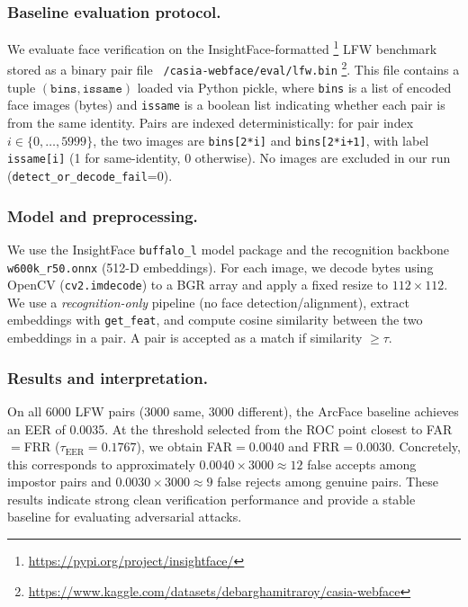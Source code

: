 \documentclass[cameraready]{Interspeech}
\begin{document}
\subsubsection{Baseline evaluation protocol.}
We evaluate face verification on the InsightFace-formatted \footnote{\url{https://pypi.org/project/insightface/}} LFW benchmark stored as a binary pair file
\texttt{~/casia-webface/eval/lfw.bin} \footnote{\url{https://www.kaggle.com/datasets/debarghamitraroy/casia-webface}}.
This file contains a tuple $(\texttt{bins}, \texttt{issame})$ loaded via Python pickle, where
\texttt{bins} is a list of encoded face images (bytes) and \texttt{issame} is a boolean list indicating whether each pair is from the same identity.
Pairs are indexed deterministically: for pair index $i\in\{0,\dots,5999\}$, the two images are \texttt{bins[2*i]} and \texttt{bins[2*i+1]}, with label \texttt{issame[i]} (1 for same-identity, 0 otherwise).
No images are excluded in our run (\texttt{detect\_or\_decode\_fail}=0).

\subsubsection{Model and preprocessing.}
We use the InsightFace \texttt{buffalo\_l} model package and the recognition backbone \texttt{w600k\_r50.onnx} (512-D embeddings).
For each image, we decode bytes using OpenCV (\texttt{cv2.imdecode}) to a BGR array and apply a fixed resize to $112\times112$.
We use a \emph{recognition-only} pipeline (no face detection/alignment), extract embeddings with \texttt{get\_feat}, and compute cosine similarity between the two embeddings in a pair.
A pair is accepted as a match if similarity $\ge \tau$.

\subsubsection{Results and interpretation.}
On all 6000 LFW pairs (3000 same, 3000 different), the ArcFace baseline achieves an EER of 0.0035.
At the threshold selected from the ROC point closest to FAR$=$FRR ($\tau_{\text{EER}}=0.1767$), we obtain FAR$=0.0040$ and FRR$=0.0030$.
Concretely, this corresponds to approximately $0.0040\times 3000\approx 12$ false accepts among impostor pairs and $0.0030\times 3000\approx 9$ false rejects among genuine pairs.
These results indicate strong clean verification performance and provide a stable baseline for evaluating adversarial attacks.

\vspace{-2mm}
\end{document}
